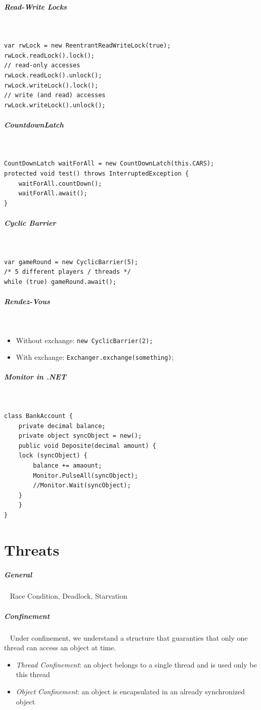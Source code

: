 \documentclass[8pt,twoside,landscape]{extarticle}
\begin{document}
\begin{multicols}{5}
\subparagraph{Read-Write Locks} \
\label{sec:org08f1a11}
\lstset{language=java,label= ,caption= ,captionpos=b,numbers=none}
\begin{lstlisting}
var rwLock = new ReentrantReadWriteLock(true);
rwLock.readLock().lock();
// read-only accesses
rwLock.readLock().unlock();
rwLock.writeLock().lock();
// write (and read) accesses
rwLock.writeLock().unlock();
\end{lstlisting}
\subparagraph{CountdownLatch} \
\label{sec:org555875b}
\lstset{language=java,label= ,caption= ,captionpos=b,numbers=none}
\begin{lstlisting}
CountDownLatch waitForAll = new CountDownLatch(this.CARS);
protected void test() throws InterruptedException {
    waitForAll.countDown();
    waitForAll.await();
}
\end{lstlisting}
\subparagraph{Cyclic Barrier} \
\label{sec:orgdba2818}
\lstset{language=java,label= ,caption= ,captionpos=b,numbers=none}
\begin{lstlisting}
var gameRound = new CyclicBarrier(5);
/* 5 different players / threads */
while (true) gameRound.await();
\end{lstlisting}

\subparagraph{Rendez-Vous} \
\label{sec:orgba944c4}
\begin{itemize}
\item Without exchange: \texttt{new CyclicBarrier(2);}
\item With exchange: \texttt{Exchanger.exchange(something)};
\end{itemize}
\subparagraph{Monitor in .NET} \
\label{sec:org6acfe89}
\lstset{language=csharp,label= ,caption= ,captionpos=b,numbers=none}
\begin{lstlisting}
class BankAccount {
    private decimal balance;
    private object syncObject = new();
    public void Deposite(decimal amount) {
	lock (syncObject) {
	    balance += amaount;
	    Monitor.PulseAll(syncObject);
	    //Monitor.Wait(syncObject);
	}
    }
}
\end{lstlisting}
\section{Threats}
\label{sec:org2a7dfa4}
\subparagraph{General} \
\label{sec:orgb207efb}
Race Condition, Deadlock, Starvation
\subparagraph{Confinement} \
\label{sec:org66bc4ae}
Under confinement, we understand a structure that guaranties that only one thread can access an object at time.
\begin{itemize}
\item \emph{Thread Confinement}: an object belongs to a single thread and is used only be this thread
\item \emph{Object Confinement}: an object is encapsulated in an already synchronized object
\end{itemize}


\end{multicols}
\end{document}
